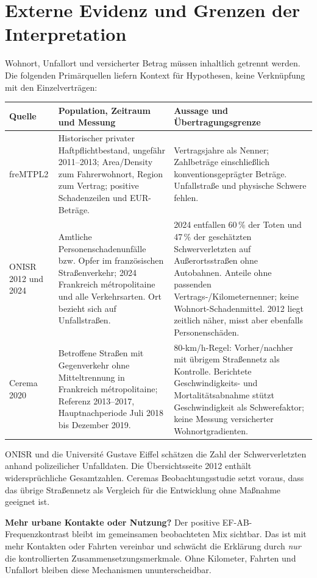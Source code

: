\documentclass[11pt,a4paper]{article}
\begin{document}
\section{Externe Evidenz und Grenzen der Interpretation}
Wohnort, Unfallort und versicherter Betrag müssen inhaltlich getrennt werden. Die folgenden Primärquellen liefern Kontext für Hypothesen, keine Verknüpfung mit den Einzelverträgen:
\begin{center}\small
\begin{tabularx}{\textwidth}{@{}L{25mm}YY@{}}\toprule
Quelle & Population, Zeitraum und Messung & Aussage und Übertragungsgrenze\\\midrule
freMTPL2 & Historischer privater Haftpflichtbestand, ungefähr 2011--2013; Area/Density zum Fahrerwohnort, Region zum Vertrag; positive Schadenzeilen und EUR-Beträge. & Vertragsjahre als Nenner; Zahlbeträge einschließlich konventionsgeprägter Beträge. Unfallstraße und physische Schwere fehlen.\\[5pt]
ONISR 2012 und 2024 \cite{onisr2012,onisr2024} & Amtliche Personenschadenunfälle bzw. Opfer im französischen Straßenverkehr; 2024 Frankreich métropolitaine und alle Verkehrsarten. Ort bezieht sich auf Unfallstraßen. & 2024 entfallen 60\,\% der Toten und 47\,\% der geschätzten Schwerverletzten auf Außerortsstraßen ohne Autobahnen. Anteile ohne passenden Vertrags-/Kilometernenner; keine Wohnort-Schadenmittel. 2012 liegt zeitlich näher, misst aber ebenfalls Personenschäden.\\[5pt]
Cerema 2020 \cite{cerema} & Betroffene Straßen mit Gegenverkehr ohne Mitteltrennung in Frankreich métropolitaine; Referenz 2013--2017, Hauptnachperiode Juli 2018 bis Dezember 2019. & 80-km/h-Regel: Vorher/nachher mit übrigem Straßennetz als Kontrolle. Berichtete Geschwindigkeits- und Mortalitätsabnahme stützt Geschwindigkeit als Schwerefaktor; keine Messung versicherter Wohnortgradienten.\\\bottomrule
\end{tabularx}
\end{center}
ONISR und die Université Gustave Eiffel schätzen die Zahl der Schwerverletzten anhand polizeilicher Unfalldaten. Die Übersichtsseite 2012 enthält widersprüchliche Gesamtzahlen. Ceremas Beobachtungsstudie setzt voraus, dass das übrige Straßennetz als Vergleich für die Entwicklung ohne Maßnahme geeignet ist.

\textbf{Mehr urbane Kontakte oder Nutzung?} Der positive EF-AB-Frequenzkontrast bleibt im gemeinsamen beobachteten Mix sichtbar. Das ist mit mehr Kontakten oder Fahrten vereinbar und schwächt die Erklärung durch \emph{nur} die kontrollierten Zusammensetzungsmerkmale. Ohne Kilometer, Fahrten und Unfallort bleiben diese Mechanismen ununterscheidbar.
\end{document}
